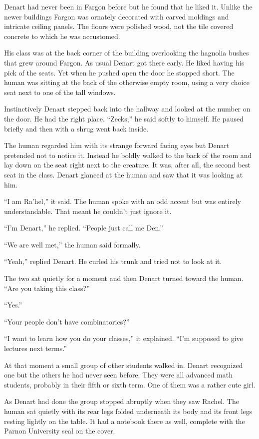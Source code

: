 
Denart had never been in Fargon before but he found that he liked it. Unlike the newer buildings
Fargon was ornately decorated with carved moldings and intricate ceiling panels. The floors were
polished wood, not the tile covered concrete to which he was accustomed.

His class was at the back corner of the building overlooking the hagnolia bushes that grew
around Fargon. As usual Denart got there early. He liked having his pick of the seats. Yet when
he pushed open the door he stopped short. The human was sitting at the back of the otherwise
empty room, using a very choice seat next to one of the tall windows.

Instinctively Denart stepped back into the hallway and looked at the number on the door. He had
the right place. ``Zecks,'' he said softly to himself. He paused briefly and then with a shrug
went back inside.

The human regarded him with its strange forward facing eyes but Denart pretended not to notice
it. Instead he boldly walked to the back of the room and lay down on the seat right next to the
creature. It was, after all, the second best seat in the class. Denart glanced at the human and
saw that it was looking at him.

``I am Ra'hel,'' it said. The human spoke with an odd accent but was entirely understandable.
That meant he couldn't just ignore it.

``I'm Denart,'' he replied. ``People just call me Den.''

``We are well met,'' the human said formally.

``Yeah,'' replied Denart. He curled his trunk and tried not to look at it.

The two sat quietly for a moment and then Denart turned toward the human. ``Are you taking this
class?''

``Yes.''

``Your people don't have combinatorics?''

``I want to learn how you do your classes,'' it explained. ``I'm supposed to give lectures next
terms.''

At that moment a small group of other students walked in. Denart recognized one but the others
he had never seen before. They were all advanced math students, probably in their fifth or sixth
term. One of them was a rather cute girl.

As Denart had done the group stopped abruptly when they saw Rachel. The human sat quietly with
its rear legs folded underneath its body and its front legs resting lightly on the table. It had
a notebook there as well, complete with the Parnon University seal on the cover.

